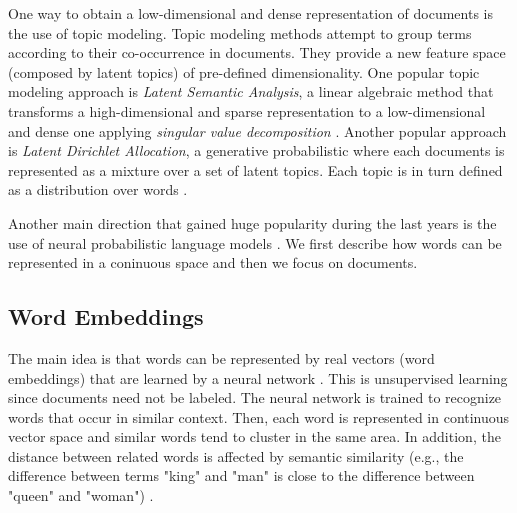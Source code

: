 

One way to obtain a low-dimensional and dense representation of documents is the use of topic modeling. Topic modeling methods attempt to group terms according to their co-occurrence in documents. They provide a new feature space (composed by latent topics) of pre-defined dimensionality. One popular topic modeling approach is \textit{Latent Semantic Analysis}, a linear algebraic method that transforms a high-dimensional and sparse representation to a low-dimensional and dense one applying \textit{singular value decomposition} . Another popular approach is \textit{Latent Dirichlet Allocation}, a generative probabilistic where each documents is represented as a mixture over a set of latent topics. Each topic is in turn defined as a distribution over words .

Another main direction that gained huge popularity during the last years is the use of neural probabilistic language models \parencite{bengio2003neural}. We first describe how words can be represented in a coninuous space and then we focus on documents.

\subsection{Word Embeddings}

The main idea is that words can be represented by real vectors (word embeddings) that are learned by a neural network . This is unsupervised learning since documents need not be labeled. The neural network is trained to recognize words that occur in similar context. Then, each word is represented in continuous vector space and similar words tend to cluster in the same area. In addition, the distance between related words is affected by semantic similarity (e.g., the difference between terms "king" and "man" is close to the difference between "queen" and "woman") . 

